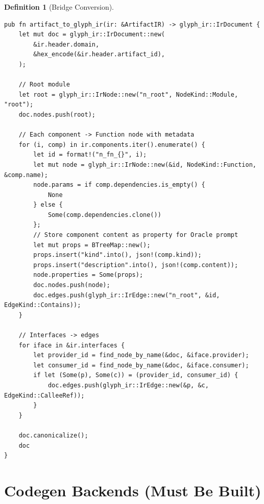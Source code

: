\documentclass[11pt,a4paper,twoside]{article}
\theoremstyle{definition}
\newtheorem{definition}{Definition}[section]
\theoremstyle{plain}
\theoremstyle{remark}
\begin{document}
\begin{definition}[Bridge Conversion]\label{def:bridge}
\begin{lstlisting}
pub fn artifact_to_glyph_ir(ir: &ArtifactIR) -> glyph_ir::IrDocument {
    let mut doc = glyph_ir::IrDocument::new(
        &ir.header.domain,
        &hex_encode(&ir.header.artifact_id),
    );

    // Root module
    let root = glyph_ir::IrNode::new("n_root", NodeKind::Module, "root");
    doc.nodes.push(root);

    // Each component -> Function node with metadata
    for (i, comp) in ir.components.iter().enumerate() {
        let id = format!("n_fn_{}", i);
        let mut node = glyph_ir::IrNode::new(&id, NodeKind::Function, &comp.name);
        node.params = if comp.dependencies.is_empty() {
            None
        } else {
            Some(comp.dependencies.clone())
        };
        // Store component content as property for Oracle prompt
        let mut props = BTreeMap::new();
        props.insert("kind".into(), json!(comp.kind));
        props.insert("description".into(), json!(comp.content));
        node.properties = Some(props);
        doc.nodes.push(node);
        doc.edges.push(glyph_ir::IrEdge::new("n_root", &id, EdgeKind::Contains));
    }

    // Interfaces -> edges
    for iface in &ir.interfaces {
        let provider_id = find_node_by_name(&doc, &iface.provider);
        let consumer_id = find_node_by_name(&doc, &iface.consumer);
        if let (Some(p), Some(c)) = (provider_id, consumer_id) {
            doc.edges.push(glyph_ir::IrEdge::new(&p, &c, EdgeKind::CalleeRef));
        }
    }

    doc.canonicalize();
    doc
}
\end{lstlisting}
\end{definition}


\section{Codegen Backends (Must Be Built)}\label{sec:codegen}
\end{document}
